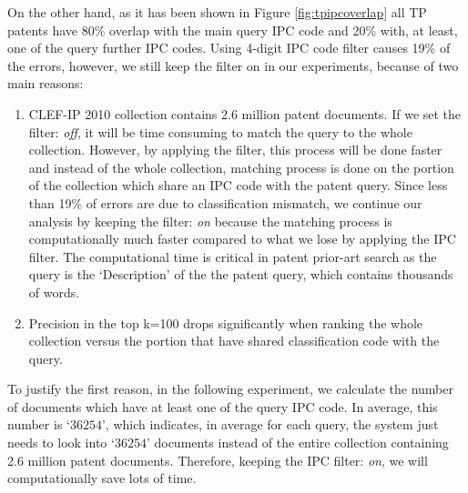 On the other hand, as it has been shown in Figure \ref{fig:tpipcoverlap} all TP patents have 80\% overlap with the main query IPC code and 20\% with, at least, one of the query further IPC codes. 
Using 4-digit IPC code filter causes 19\% of the errors, however, we still keep the filter on in our experiments, because of two main reasons: 
\begin{enumerate}
\item CLEF-IP 2010 collection contains 2.6 million patent documents. If we set the filter: \textit{off}, it will be time consuming to match the query to the whole collection. However, by applying the filter, this process will be done faster and instead of the whole collection, matching process is done on the portion of the collection which share an IPC code with the patent query. Since less than 19\% of errors are due to classification mismatch, we continue our analysis by keeping the filter: \textit{on} because the matching process is computationally much faster compared to what we lose by applying the IPC filter. The computational time is critical in patent prior-art search as the query is the `Description' of the the patent query, which contains thousands of words.   
\item Precision in the top k=100 drops significantly when ranking the whole collection versus the portion that have shared classification code with the query.  
\end{enumerate}
To justify the first reason, in the following experiment, we calculate the number of documents which have at least one of the query IPC code. In average, this number is `$ 36254 $', which indicates, in average for each query, the system just needs to look into `$ 36254 $' documents instead of the entire collection containing 2.6 million patent documents. Therefore, keeping the IPC filter: \textit{on}, we will computationally save lots of time.  
